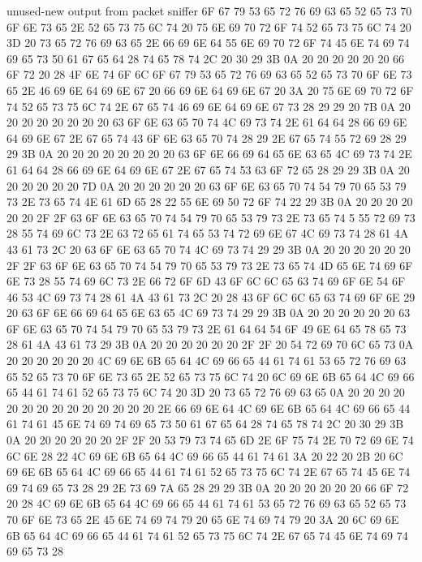 \begin{chunk}{unused-new output from packet sniffer}
6F 67 79 53 65 72 76 69 63 65 52 65 73 70 6F 6E 73 65 2E 52 65 73 75 6C 74 
20 75 6E 69 70 72 6F 74 52 65 73 75 6C 74 20 3D 20 73 65 72 76 69 63 65 2E 
66 69 6E 64 55 6E 69 70 72 6F 74 45 6E 74 69 74 69 65 73 50 61 67 65 64 28 
74 65 78 74 2C 20 30 29 3B 0A 20 20 20 20 20 20 66 6F 72 20 28 4F 6E 74 6F 
6C 6F 67 79 53 65 72 76 69 63 65 52 65 73 70 6F 6E 73 65 2E 46 69 6E 64 69 
6E 67 20 66 69 6E 64 69 6E 67 20 3A 20 75 6E 69 70 72 6F 74 52 65 73 75 6C 
74 2E 67 65 74 46 69 6E 64 69 6E 67 73 28 29 29 20 7B 0A 20 20 20 20 20 20 
20 20 63 6F 6E 63 65 70 74 4C 69 73 74 2E 61 64 64 28 66 69 6E 64 69 6E 67 
2E 67 65 74 43 6F 6E 63 65 70 74 28 29 2E 67 65 74 55 72 69 28 29 29 3B 0A 
20 20 20 20 20 20 20 20 63 6F 6E 66 69 64 65 6E 63 65 4C 69 73 74 2E 61 64 
64 28 66 69 6E 64 69 6E 67 2E 67 65 74 53 63 6F 72 65 28 29 29 3B 0A 20 20 
20 20 20 20 7D 0A 20 20 20 20 20 20 63 6F 6E 63 65 70 74 54 79 70 65 53 79 
73 2E 73 65 74 4E 61 6D 65 28 22 55 6E 69 50 72 6F 74 22 29 3B 0A 20 20 20 
20 20 20 2F 2F 63 6F 6E 63 65 70 74 54 79 70 65 53 79 73 2E 73 65 74 
5
55 72 69 73 28 55 74 69 6C 73 2E 63 72 65 61 74 65 53 74 72 69 6E 67 4C 69 
73 74 28 61 4A 43 61 73 2C 20 63 6F 6E 63 65 70 74 4C 69 73 74 29 29 3B 0A 
20 20 20 20 20 20 2F 2F 63 6F 6E 63 65 70 74 54 79 70 65 53 79 73 2E 73 65 
74 4D 65 6E 74 69 6F 6E 73 28 55 74 69 6C 73 2E 66 72 6F 6D 43 6F 6C 6C 65 
63 74 69 6F 6E 54 6F 46 53 4C 69 73 74 28 61 4A 43 61 73 2C 20 28 43 6F 6C 
6C 65 63 74 69 6F 6E 29 20 63 6F 6E 66 69 64 65 6E 63 65 4C 69 73 74 29 29 
3B 0A 20 20 20 20 20 20 63 6F 6E 63 65 70 74 54 79 70 65 53 79 73 2E 61 64 
64 54 6F 49 6E 64 65 78 65 73 28 61 4A 43 61 73 29 3B 0A 20 20 20 20 20 20 
2F 2F 20 54 72 69 70 6C 65 73 0A 20 20 20 20 20 20 4C 69 6E 6B 65 64 4C 69 
66 65 44 61 74 61 53 65 72 76 69 63 65 52 65 73 70 6F 6E 73 65 2E 52 65 73 
75 6C 74 20 6C 69 6E 6B 65 64 4C 69 66 65 44 61 74 61 52 65 73 75 6C 74 20 
3D 20 73 65 72 76 69 63 65 0A 20 20 20 20 20 20 20 20 20 20 20 20 20 20 2E 
66 69 6E 64 4C 69 6E 6B 65 64 4C 69 66 65 44 61 74 61 45 6E 74 69 74 69 65 
73 50 61 67 65 64 28 74 65 78 74 2C 20 30 29 3B 0A 20 20 20 20 20 20 2F 2F 
20 53 79 73 74 65 6D 2E 6F 75 74 2E 70 72 69 6E 74 6C 6E 28 22 4C 69 6E 6B 
65 64 4C 69 66 65 44 61 74 61 3A 20 22 20 2B 20 6C 69 6E 6B 65 64 4C 69 66 
65 44 61 74 61 52 65 73 75 6C 74 2E 67 65 74 45 6E 74 69 74 69 65 73 28 29 
2E 73 69 7A 65 28 29 29 3B 0A 20 20 20 20 20 20 66 6F 72 20 28 4C 69 6E 6B 
65 64 4C 69 66 65 44 61 74 61 53 65 72 76 69 63 65 52 65 73 70 6F 6E 73 65 
2E 45 6E 74 69 74 79 20 65 6E 74 69 74 79 20 3A 20 6C 69 6E 6B 65 64 4C 69 
66 65 44 61 74 61 52 65 73 75 6C 74 2E 67 65 74 45 6E 74 69 74 69 65 73 28 

\end{chunk}
